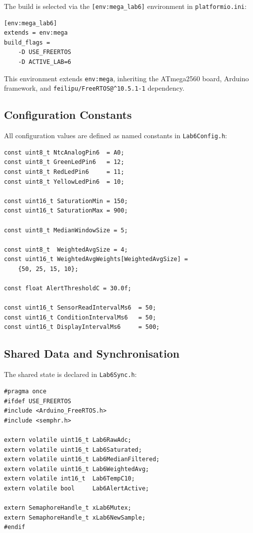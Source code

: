 \documentclass[12pt]{article}
\begin{document}
The build is selected via the \texttt{[env:mega\_lab6]} environment in \texttt{platformio.ini}:

\begin{lstlisting}
[env:mega_lab6]
extends = env:mega
build_flags =
    -D USE_FREERTOS
    -D ACTIVE_LAB=6
\end{lstlisting}

This environment extends \texttt{env:mega}, inheriting the ATmega2560 board, Arduino framework, and \texttt{feilipu/FreeRTOS@\^{}10.5.1-1} dependency.

\subsection{Configuration Constants}

All configuration values are defined as named constants in \texttt{Lab6Config.h}:

\begin{lstlisting}[caption={Lab6Config.h --- configuration constants}]
const uint8_t NtcAnalogPin6  = A0;
const uint8_t GreenLedPin6   = 12;
const uint8_t RedLedPin6     = 11;
const uint8_t YellowLedPin6  = 10;

const uint16_t SaturationMin = 150;
const uint16_t SaturationMax = 900;

const uint8_t MedianWindowSize = 5;

const uint8_t  WeightedAvgSize = 4;
const uint16_t WeightedAvgWeights[WeightedAvgSize] =
    {50, 25, 15, 10};

const float AlertThresholdC = 30.0f;

const uint16_t SensorReadIntervalMs6  = 50;
const uint16_t ConditionIntervalMs6   = 50;
const uint16_t DisplayIntervalMs6     = 500;
\end{lstlisting}

\subsection{Shared Data and Synchronisation}

The shared state is declared in \texttt{Lab6Sync.h}:

\begin{lstlisting}[caption={Lab6Sync.h --- shared volatile data and sync handles}]
#pragma once
#ifdef USE_FREERTOS
#include <Arduino_FreeRTOS.h>
#include <semphr.h>

extern volatile uint16_t Lab6RawAdc;
extern volatile uint16_t Lab6Saturated;
extern volatile uint16_t Lab6MedianFiltered;
extern volatile uint16_t Lab6WeightedAvg;
extern volatile int16_t  Lab6TempC10;
extern volatile bool     Lab6AlertActive;

extern SemaphoreHandle_t xLab6Mutex;
extern SemaphoreHandle_t xLab6NewSample;
#endif
\end{lstlisting}
\end{document}
